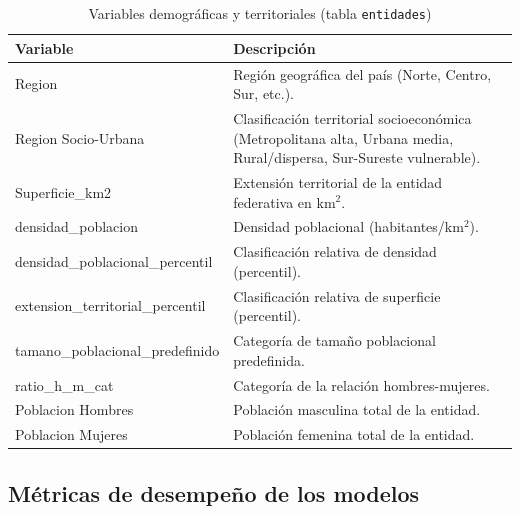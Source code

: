 \documentclass[12pt, letterpaper]{article}
\begin{document}
\begin{table}[H]
\centering
\caption{Variables demográficas y territoriales (tabla \texttt{entidades})}
\label{tab:vars_demo}
\small
\begin{tabularx}{\textwidth}{>{\ttfamily}l X}
\toprule
\textbf{Variable} & \textbf{Descripción} \\
\midrule
Region                          & Región geográfica del país (Norte, Centro, Sur, etc.). \\
Region Socio-Urbana             & Clasificación territorial socioeconómica (Metropolitana alta, Urbana media, Rural/dispersa, Sur-Sureste vulnerable). \\
Superficie\_km2                 & Extensión territorial de la entidad federativa en km$^2$. \\
densidad\_poblacion             & Densidad poblacional (habitantes/km$^2$). \\
densidad\_poblacional\_percentil & Clasificación relativa de densidad (percentil). \\
extension\_territorial\_percentil & Clasificación relativa de superficie (percentil). \\
tamano\_poblacional\_predefinido & Categoría de tamaño poblacional predefinida. \\
ratio\_h\_m\_cat                & Categoría de la relación hombres-mujeres. \\
Poblacion Hombres               & Población masculina total de la entidad. \\
Poblacion Mujeres               & Población femenina total de la entidad. \\
\bottomrule
\end{tabularx}
\end{table}

\subsection{Métricas de desempeño de los modelos}
\end{document}
